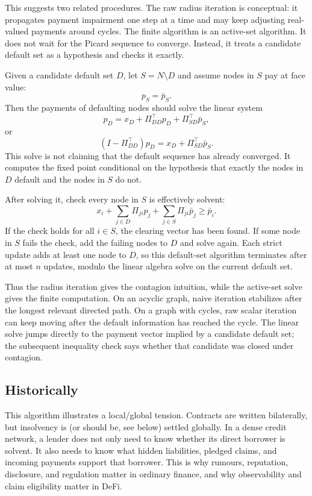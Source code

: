 \documentclass[11pt,oneside]{article}
\newcommand{\barp}{\bar p}
\begin{document}
This suggests two related procedures. The raw radius iteration is conceptual:
it propagates payment impairment one step at a time and may keep adjusting
real-valued payments around cycles. The finite algorithm is an active-set
algorithm. It does not wait for the Picard sequence to converge. Instead, it
treats a candidate default set as a hypothesis and checks it exactly.

Given a candidate default set $D$, let $S=N\setminus D$ and assume nodes in $S$
pay at face value:
\[
  p_S=\barp_S.
\]
Then the payments of defaulting nodes should solve the linear system
\[
  p_D=x_D+\Pi_{DD}^{\top}p_D+\Pi_{SD}^{\top}\barp_S,
\]
or
\[
  (I-\Pi_{DD}^{\top})p_D=x_D+\Pi_{SD}^{\top}\barp_S.
\]
This solve is not claiming that the default sequence has already converged. It
computes the fixed point conditional on the hypothesis that exactly the nodes
in $D$ default and the nodes in $S$ do not. 

After solving it, check every node in $S$ is effectively solvent:
\[
  x_i+\sum_{j\in D}\Pi_{ji}p_j+\sum_{j\in S}\Pi_{ji}\barp_j\geq \barp_i.
\]
If the check holds for all $i\in S$, the clearing vector has been found. If
some node in $S$ fails the check, add the failing nodes to $D$ and solve again.
Each strict update adds at least one node to $D$, so this default-set algorithm
terminates after at most $n$ updates, modulo the linear algebra solve on the
current default set.

Thus the radius iteration gives the contagion intuition, while the active-set
solve gives the finite computation. On an acyclic graph, naive iteration
stabilizes after the longest relevant directed path. On a graph with cycles,
raw scalar iteration can keep moving after the default information has reached
the cycle. The linear solve jumps directly to the payment vector implied by a
candidate default set; the subsequent inequality check says whether that
candidate was closed under contagion.

\subsection{Historically}
This algorithm illustrates a local/global tension. Contracts are written
bilaterally, but insolvency is (or should be, see below) settled globally.
In a dense credit network, a lender does not only need to know whether its
direct borrower is solvent. It also needs to know what hidden liabilities,
pledged claims, and incoming payments support that borrower. This is why
rumours, reputation, disclosure, and regulation matter in ordinary finance,
and why observability and claim eligibility matter in DeFi.
\end{document}
